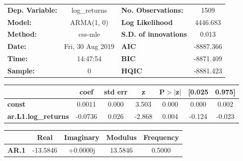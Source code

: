 \begin{center}
\begin{tabular}{lclc}
\toprule
\textbf{Dep. Variable:}     &        log\_returns       & \textbf{  No. Observations:  } &            1509            \\
\textbf{Model:}             &         ARMA(1, 0)        & \textbf{  Log Likelihood     } &          4446.683          \\
\textbf{Method:}            &          css-mle          & \textbf{  S.D. of innovations} &           0.013            \\
\textbf{Date:}              &      Fri, 30 Aug 2019     & \textbf{  AIC                } &         -8887.366          \\
\textbf{Time:}              &          14:47:54         & \textbf{  BIC                } &         -8871.409          \\
\textbf{Sample:}            &             0             & \textbf{  HQIC               } &         -8881.423          \\
\bottomrule
\end{tabular}
\newline
\hspace{0.5cm}
\newline

\begin{tabular}{lcccccc}
                            & \textbf{coef} & \textbf{std err} & \textbf{z} & \textbf{P$> |$z$|$} & \textbf{[0.025} & \textbf{0.975]}  \\
\midrule
\textbf{const}              &       0.0011  &        0.000     &     3.503  &         0.000        &        0.000    &        0.002     \\
\textbf{ar.L1.log\_returns} &      -0.0736  &        0.026     &    -2.868  &         0.004        &       -0.124    &       -0.023     \\
\bottomrule
\end{tabular}
\begin{tabular}{lcccc}
              & \textbf{            Real} & \textbf{         Imaginary} & \textbf{         Modulus} & \textbf{        Frequency}  \\
\midrule
\textbf{AR.1} &              -13.5846     &                +0.0000j     &               13.5846     &                0.5000       \\
\bottomrule
\end{tabular}
\end{center}
